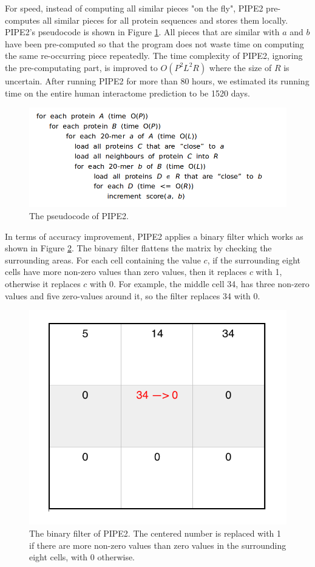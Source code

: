 For speed, instead of computing all similar pieces "on the fly", PIPE2 pre-computes all similar pieces for all protein sequences and stores them locally. PIPE2's pseudocode is shown in Figure \ref{fig_pseudocode_pipe2}. All pieces that are similar with $a$ and $b$ have been pre-computed so that the program does not waste time on computing the same re-occurring piece repeatedly. The time complexity of PIPE2, ignoring the pre-computating part, is improved to $O(P^2L^2R)$ where the size of $R$ is uncertain. After running PIPE2 for more than 80 hours, we estimated its running time on the entire human interactome prediction to be 1520 days.   
\begin{figure}[h!]
\begin{center}
\includegraphics[width =15cm]{img/PIPE2_psedu.png}
\caption[The pseudocode of PIPE2]{The pseudocode of PIPE2.  \label{fig_pseudocode_pipe2}}
\end{center}
\end{figure} 

In terms of accuracy improvement, PIPE2 applies a binary filter which works as shown in Figure \ref{fig_binary_filter}. The binary filter flattens the matrix by checking the surrounding areas. For each cell containing the value $c$, if the surrounding eight cells have more non-zero values than zero values, then it replaces $c$ with 1, otherwise it replaces $c$ with 0. For example, the middle cell 34, has three non-zero values and five zero-values around it, so the filter replaces 34 with 0.

\begin{figure}[h!]
\begin{center}
\includegraphics[height = 4 cm]{img/binary_filter.png}
\caption[The binary filter of PIPE2]{The binary filter of PIPE2. The centered number is replaced with 1 if there are more non-zero values than zero values in the surrounding eight cells, with 0 otherwise.  \label{fig_binary_filter}}
\end{center}
\end{figure} 

